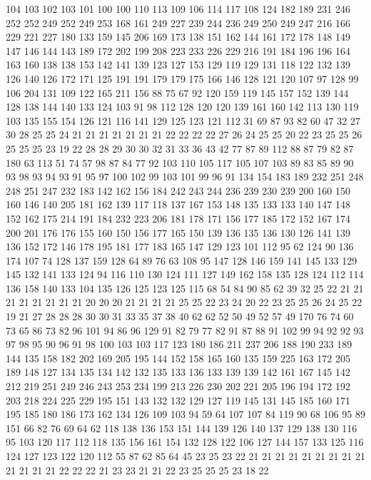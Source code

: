 104 103 102 103 101 100 100 110 113 109 106 114 117 108 124 182 189 231 246 252
252 249 252 249 253 168 161 249 227 239 244 236 249 250 249 247 216 166 229 221
227 180 133 159 145 206 169 173 138 151 162 144 161 172 178 148 149 147 146 144
143 189 172 202 199 208 223 233 226 229 216 191 184 196 196 164 163 160 138 138
153 142 141 139 123 127 153 129 119 129 131 118 122 132 139 126 140 126 172 171
125 191 191 179 179 175 166 146 128 121 120 107 97 128 99 106 204 131 109 122
165 211 156 88 75 67 92 120 159 119 145 157 152 139 144 128 138 144 140 133
124 103 91 98 112 128 120 120 139 161 160 142 113 130 119 103 135 155 154 126
121 116 141 129 125 123 121 112 31 69 87 93 82 60 47 32 27 30 28 25
25 24 21 21 21 21 21 21 21 22 22 22 22 27 26 24 25 25 20 22
23 25 25 26 25 25 25 23 19 22 28 28 29 30 30 32 31 33 36 43
42 77 87 89 112 88 87 79 82 87 180 63 113 51 74 57 98 87 84 77
92 103 110 105 117 105 107 103 89 83 85 89 90 93 98 93 94 93 91 95
97 100 102 99 103 101 99 96 91 134 154 183 189 232 251 248 248 251 247 232
183 142 162 156 184 242 243 244 236 239 230 239 200 160 150 160 146 140 205 181
162 139 117 118 137 167 153 148 135 133 133 140 147 148 152 162 175 214 191 184
232 223 206 181 178 171 156 177 185 172 152 167 174 200 201 176 176 155 160 150
156 177 165 150 139 136 135 136 130 126 141 139 136 152 172 146 178 195 181 177
183 165 147 129 123 101 112 95 62 124 90 136 174 107 74 128 137 159 128 64
89 76 63 108 95 147 128 146 159 141 145 133 129 145 132 141 133 124 94 116
110 130 124 111 127 149 162 158 135 128 124 112 114 136 158 140 133 104 135 126
125 123 125 115 68 54 84 90 85 62 39 32 25 22 21 21 21 21 21 21
21 21 20 20 20 21 21 21 21 25 25 22 23 24 20 22 23 25 25 26
24 25 22 19 21 27 28 28 28 30 30 31 33 35 37 38 40 62 62 52
50 49 52 57 49 170 76 74 60 73 65 86 73 82 96 101 94 86 96 129
91 82 79 77 82 91 87 88 91 102 99 94 92 92 93 97 98 95 90 96
91 98 100 103 103 117 123 180 186 211 237 206 188 190 233 189 144 135 158 182
202 169 205 195 144 152 158 165 160 135 159 225 163 172 205 189 148 127 134 135
134 142 132 135 133 136 133 139 139 142 161 167 145 142 212 219 251 249 246 243
253 234 199 213 226 230 202 221 205 196 194 172 192 203 218 224 225 229 195 151
143 132 132 129 127 119 145 131 145 185 160 171 195 185 180 186 173 162 134 126
109 103 94 59 64 107 107 84 119 90 68 106 95 89 151 66 82 76 69 64
62 118 138 136 153 151 144 139 126 140 137 129 138 130 116 95 103 120 117 112
118 135 156 161 154 132 128 122 106 127 144 157 133 125 116 124 127 123 122 120
112 55 87 62 85 64 45 23 25 23 22 21 21 21 21 21 21 21 21 21
21 21 21 21 22 22 22 21 23 23 21 21 22 23 25 25 25 23 18 22
